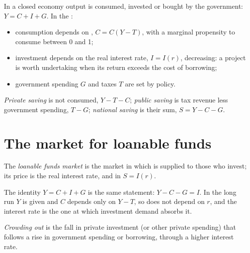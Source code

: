 In a closed economy output is consumed, invested or bought by the
government: $Y = C + I + G$. In the :
\begin{itemize}
  \item consumption depends on , $C = C(Y - T)$, with a
  marginal propensity to consume between 0 and 1;
  \item investment depends on the real interest rate, $I = I(r)$, decreasing:
  a project is worth undertaking when its return exceeds the cost of
  borrowing;
  \item government spending $G$ and taxes $T$ are set by policy.
\end{itemize}

\begin{definition}\label{def:b1:long-run-model:saving}
\emph{Private saving} is  not consumed, $Y - T - C$;
\emph{public saving} is tax revenue less government spending, $T - G$;
\emph{national saving} is their sum, $S = Y - C - G$.
\end{definition}

\section{The market for loanable funds}\label{sec:b1:long-run-model:loanable}

\begin{definition}\label{def:b1:long-run-model:loanable-funds}
The \emph{loanable funds market} is the market in which  is
supplied to those who invest; its price is the real interest rate, and in
 $S = I(r)$.
\end{definition}

The identity $Y = C + I + G$ is the same statement: $Y - C - G = I$. In the long
run $Y$ is given and $C$ depends only on $Y - T$, so  does not
depend on $r$, and the  interest rate is the one at which
investment demand absorbs it.

\begin{definition}\label{def:b1:long-run-model:crowding-out}
\emph{Crowding out} is the fall in private investment (or other private
spending) that follows a rise in government spending or borrowing, through
a higher interest rate.
\end{definition}


